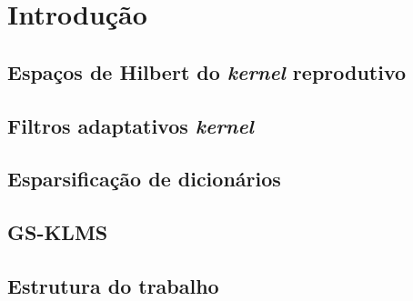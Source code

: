 \chapter{Introdução} \label{cap:introducao}

\section{Espaços de Hilbert do \textit{kernel} reprodutivo}

\section{Filtros adaptativos \textit{kernel}}

\section{Esparsificação de dicionários}

\section{GS-KLMS}

\section{Estrutura do trabalho}
